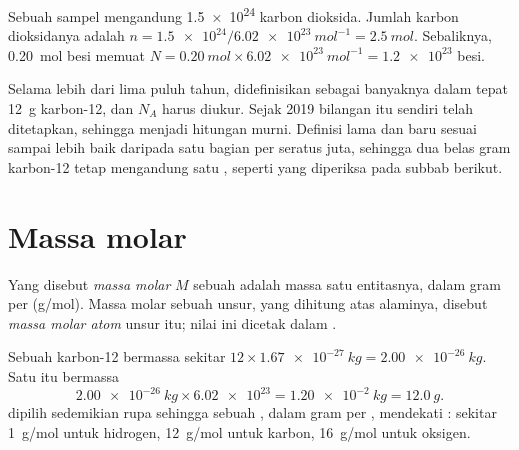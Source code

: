 \begin{example}\label{ex:g10:the-mole:convert}
Sebuah sampel mengandung \num{1.5e24}  karbon dioksida. Jumlah
karbon dioksidanya adalah
$n = \num{1.5e24} / \qty{6.02e23}{mol^{-1}} = \qty{2.5}{mol}$.
Sebaliknya, \qty{0.20}{mol} besi memuat
$N = \qty{0.20}{mol} \times \qty{6.02e23}{mol^{-1}} = \num{1.2e23}$
 besi.
\end{example}

\begin{remark}\label{rem:g10:the-mole:origin}
Selama lebih dari lima puluh tahun,  didefinisikan sebagai banyaknya
 dalam tepat \qty{12}{g} karbon-12, dan $N_A$ harus diukur. Sejak
2019 bilangan itu sendiri telah ditetapkan, sehingga  menjadi hitungan
murni. Definisi lama dan baru sesuai sampai lebih baik daripada satu
bagian per seratus juta, sehingga dua belas gram karbon-12 tetap
mengandung satu  , seperti yang diperiksa pada subbab berikut.
\end{remark}

\section{Massa molar}

\begin{definition}\label{def:g10:the-mole:molar-mass}
Yang disebut \emph{massa molar} $M$ sebuah  adalah massa satu  entitasnya, dalam gram per 
(\si{g/mol}). Massa molar sebuah unsur, yang dihitung atas 
 alaminya, disebut
\emph{massa molar atom} unsur itu; nilai ini
dicetak dalam .
\end{definition}

\begin{example}\label{ex:g10:the-mole:carbon}
Sebuah  karbon-12 bermassa sekitar
$12 \times \qty{1.67e-27}{kg} = \qty{2.00e-26}{kg}$. Satu   itu
bermassa
\[
  \qty{2.00e-26}{kg} \times \num{6.02e23} = \qty{1.20e-2}{kg}
  = \qty{12.0}{g}.
\]
 dipilih sedemikian rupa sehingga  sebuah , dalam gram
per , mendekati : sekitar \qty{1}{g/mol} untuk
hidrogen, \qty{12}{g/mol} untuk karbon, \qty{16}{g/mol} untuk oksigen.
\end{example}

